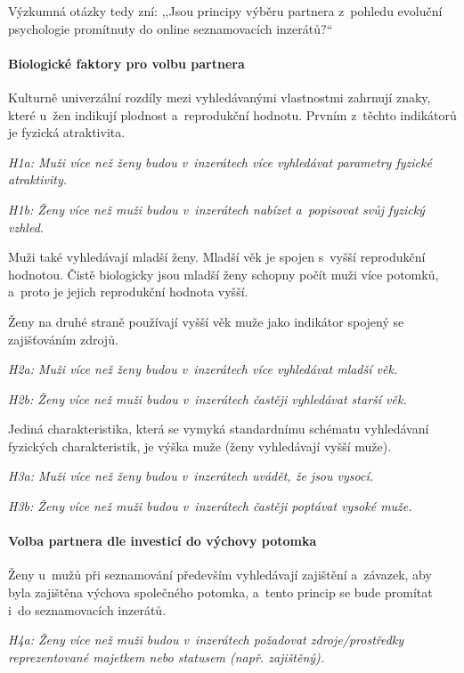 \documentclass[a4paper, 12pt, notitlepage, oneside, numbers=noenddot]{report}
\begin{document}
Výzkumná otázky tedy zní: ,,Jsou principy výběru partnera z~pohledu
evoluční psychologie promítnuty do online seznamovacích inzerátů$?$``

\paragraph{Biologické faktory pro volbu partnera}

Kulturně univerzální rozdíly mezi vy\-hle\-dá\-vanými vlastnostmi zahrnují
znaky, které u~žen indikují plodnost a~reprodukční hodnotu.  Prvním
z~těchto indikátorů je fyzická atraktivita.

\emph{H1a: Muži více než ženy budou v~inzerátech více vyhledávat parametry fyzické
  atraktivity.}

\emph{H1b: Ženy více než muži budou v~inzerátech nabízet a~popisovat svůj
  fyzický vzhled.}

Muži také vyhledávají mladší ženy.  Mladší věk je spojen s~vyšší
reprodukční hodnotou.  Čistě biologicky jsou mladší ženy schopny počít
muži více potomků, a~proto je jejich reprodukční hodnota vyšší.

Ženy na druhé straně používají vyšší věk muže jako indikátor spojený
se zajišťováním zdrojů.

\emph{H2a: Muži více než ženy budou v~inzerátech více vyhledávat mladší věk.}

\emph{H2b: Ženy více než muži budou v~inzerátech častěji vyhledávat starší věk.}

Jediná charakteristika, která se vymyká standardnímu schématu
vyhledávaní fyzických charakteristik, je výška muže (ženy vyhledávají
vyšší muže).

\emph{H3a: Muži více než ženy budou v~inzerátech uvádět, že jsou vysocí.}

\emph{H3b: Ženy více než muži budou v~inzerátech častěji poptávat vysoké muže.}

\paragraph{Volba partnera dle investicí do výchovy potomka}

Ženy u~mužů při seznamování především vyhledávají zajištění a~závazek,
aby byla zajištěna výchova společného potomka, a~tento princip se bude
promítat i~do seznamovacích inzerátů.

\emph{H4a: Ženy více než muži budou v~inzerátech požadovat zdroje/prostředky
  reprezentované majetkem nebo statusem (např. zajištěný).}
\end{document}
